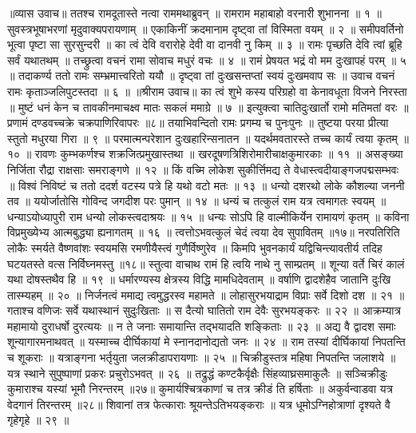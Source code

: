 ॥व्यास उवाच॥
ततश्च रामदूतास्ते नत्वा राममथाब्रुवन् ॥
रामराम महाबाहो वरनारी शुभानना ॥ १ ॥
सुवस्त्रभूषाभरणां मृदुवाक्यपरायणाम् ॥
एकाकिनीं क्रदमानाम दृष्ट्वा तां विस्मिता वयम् ॥ २ ॥
समीपवर्तिनो भूत्वा पृष्टा सा सुरसुन्दरी ॥
का त्वं देवि वरारोहे देवी वा दानवी नु किम् ॥ ३ ॥
रामः पृच्छति देवि त्वां ब्रूहि सर्वं यथातथम् ॥
तच्छ्रुत्वा वचनं रामा सोवाच मधुरं वचः ॥ ४ ॥
रामं प्रेषयत भद्रं वो मम दुःखापहं परम् ॥ ५ ॥
तदाकर्ण्य ततो रामः सम्भ्रमात्त्वरितो ययौ ॥
दृष्ट्वा तां दुःखसन्तप्तां स्वयं दुःखमवाप सः ॥
उवाच वचनं रामः कृताञ्जलिपुटस्तदा ॥ ६ ॥
॥श्रीराम उवाच॥
का त्वं शुभे कस्य परिग्रहो वा केनावधूता विजने निरस्ता ॥
मुष्टं धनं केन च तावकीनमाचक्ष्व मातः सकलं ममाग्रे ॥ ७ ॥
इत्युक्त्वा चातिदुःखार्तो रामो मतिमतां वरः ॥
प्रणामं दण्डवच्चक्रे चक्रपाणिरिवापरः ॥८॥
तयाभिवन्दितो रामः प्रगम्य च पुनःपुनः ॥
तुष्टया परया प्रीत्या स्तुतो मधुरया गिरा ॥ ९ ॥
परमात्मन्परेशान दुःखहारिन्सनातन ॥
यदर्थमवतारस्ते तच्च कार्यं त्वया कृतम् ॥ १० ॥
रावणः कुम्भकर्णश्च शक्रजित्प्रमुखास्तथा ॥
खरदूषणत्रिशिरोमारीचाक्षकुमारकाः ॥ ११ ॥
असङ्ख्या निर्जिता रौद्रा राक्षसाः समराङ्गणे ॥ १२ ॥
किं वच्मि लोकेश सुकीर्त्तिमद्य ते वेधास्त्वदीयाङ्गजपद्मसम्भवः ॥
विश्वं निविष्टं च ततो ददर्श वटस्य पत्रे हि यथो वटो मतः ॥ १३ ॥
धन्यो दशरथो लोके कौशल्या जननी तव ॥
ययोर्जातोसि गोविन्द जगदीश परः पुमान् ॥ १४ ॥
धन्यं च तत्कुलं राम यत्र त्वमागतः स्वयम् ॥
धन्याऽयोध्यापुरी राम धन्यो लोकस्त्वदाश्रयः ॥ १५ ॥
धन्यः सोऽपि हि वाल्मीकिर्येन रामायणं कृतम् ॥
कविना विप्रमुख्येभ्य आत्मबुद्ध्या ह्यनागतम् ॥ १६ ॥
त्वत्तोऽभवत्कुलं चेदं त्वया देव सुपावितम् ॥१७॥
नरपतिरिति लोकैः स्मर्यते वैष्णवांशः स्वयमसि रमणीयैस्त्वं गुणैर्विष्णुरेव ॥
किमपि भुवनकार्यं यद्विचिन्त्यावतीर्य तदिह घटयतस्ते वत्स निर्विघ्नमस्तु ॥१८॥
स्तुत्वा वाचाथ रामं हि त्वयि नाथे नु साम्प्रतम् ॥
शून्या वर्ते चिरं कालं यथा दोषस्तथैव हि ॥ १९ ॥
धर्मारण्यस्य क्षेत्रस्य विद्धि मामधिदेवताम् ॥
वर्षाणि द्वादशेहैव जातानि दुःखि तास्म्यहम् ॥ २० ॥
निर्जनत्वं ममाद्य त्वमुद्धरस्व महामते ॥
लोहासुरभयाद्राम विप्राः सर्वे दिशो दश ॥ २१ ॥
गताश्च वणिजः सर्वे यथास्थानं सुदुःखिताः ॥
स दैत्यो घातितो राम देवैः सुरभयङ्करः ॥ २२ ॥
आक्रम्यात्र महामायो दुराधर्षो दुरत्ययः ॥
न ते जनाः समायान्ति तद्भयादति शङ्किताः ॥ २३ ॥
अद्य वै द्वादश समाः शून्यागारमनाथवत् ॥
यस्माच्च दीर्घिकायां मे स्नानदानोद्यतो जनः ॥ २४ ॥
राम तस्यां दीर्घिकायां निपतन्ति च शूकराः ॥
यत्राङ्गना भर्तृयुता जलक्रीडापरायणाः ॥ २५ ॥
चिक्रीडुस्तत्र महिषा निपतन्ति जलाशये ॥
यत्र स्थाने सुपुष्पाणां प्रकरः प्रचुरोऽभवत् ॥ २६ ॥
तद्रुद्धं कण्टकैर्वृक्षैः सिंहव्याघ्रसमाकुलैः ॥
सञ्चिक्रीडुः कुमाराश्च यस्यां भूमौ निरन्तरम् ॥२७॥
कुमार्यश्चित्रकाणां च तत्र क्रीडं ति हर्षिताः ॥
अकुर्वन्वाडवा यत्र वेदगानं तिरन्तरम् ॥२८॥
शिवानां तत्र फेत्काराः श्रूयन्तेऽतिभयङ्कराः ॥
यत्र धूमोऽग्निहोत्राणां दृश्यते वै गृहेगृहे ॥ २९ ॥
